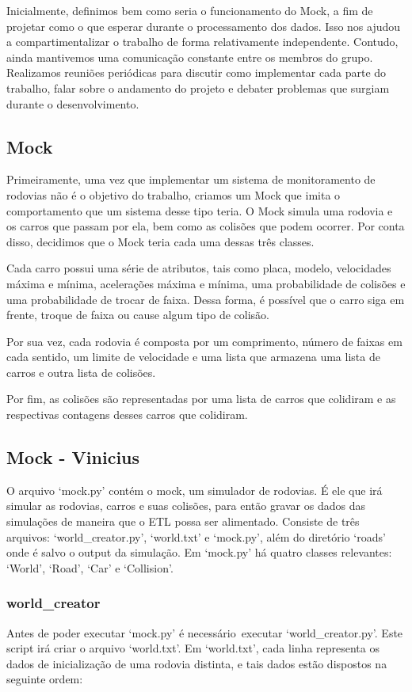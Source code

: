 \documentclass{article}
\begin{document}
    Inicialmente, definimos bem como seria o funcionamento do Mock, a fim de projetar
    como o que esperar durante o processamento dos dados. Isso nos ajudou a 
    compartimentalizar o trabalho de forma relativamente independente. Contudo, ainda
    mantivemos uma comunicação constante entre os membros do grupo. Realizamos reuniões
    periódicas para discutir como implementar cada parte do trabalho, falar sobre o 
    andamento do projeto e debater problemas que surgiam durante o desenvolvimento.

    \subsection*{Mock}
    Primeiramente, uma vez que implementar um sistema de monitoramento de rodovias
    não é o objetivo do trabalho, criamos um Mock que imita o comportamento que um sistema desse tipo teria.
    O Mock simula uma rodovia e os carros que passam por ela, bem como as colisões que podem ocorrer.
    Por conta disso, decidimos que o Mock teria cada uma dessas três classes.
    
    Cada carro possui uma série de atributos, tais como placa, modelo, velocidades máxima e mínima, 
    acelerações máxima e mínima, uma probabilidade de colisões e uma probabilidade de trocar de faixa.
    Dessa forma, é possível que o carro siga em frente, troque de faixa ou cause algum tipo de colisão.

    Por sua vez, cada rodovia é composta por um comprimento, número de faixas em cada sentido,
    um limite de velocidade e uma lista que armazena uma lista de carros e outra lista de colisões.

    Por fim, as colisões são representadas por uma lista de carros que colidiram e as respectivas
    contagens desses carros que colidiram.

    \subsection*{Mock - Vinicius}
    O arquivo `mock.py' contém o mock, um simulador de rodovias. É ele que irá simular as rodovias,
    carros e suas colisões, para então gravar os dados das simulações de maneira que o ETL possa ser alimentado.
    Consiste de três arquivos: `world\_creator.py', `world.txt' e `mock.py', além do diretório `roads' onde é salvo
    o output da simulação. Em `mock.py' há quatro classes relevantes: `World', `Road', `Car' e `Collision'.

    \subsubsection*{world\_creator}
    Antes de poder executar `mock.py' é necessário\ executar `world\_creator.py'. Este script irá criar o arquivo
    `world.txt'. Em `world.txt', cada linha representa os dados de inicialização de uma rodovia distinta, e tais
    dados estão dispostos na seguinte ordem:
\end{document}
